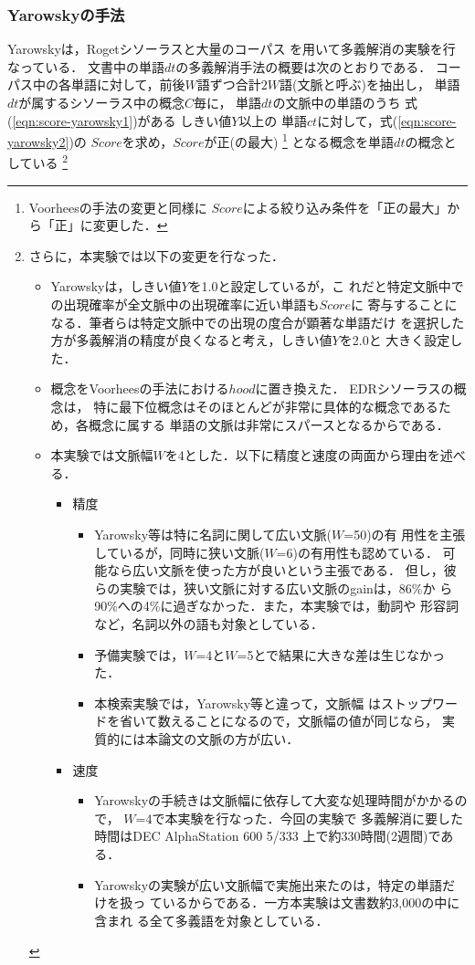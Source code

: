 \subsubsection{Yarowskyの手法}\label{sec:yarowsky-apply}
\vspace*{-1mm}
  Yarowskyは，Rogetシソーラスと大量のコーパス
  を用いて多義解消の実験を行なっている\cite{Yarowsky92}． 
  文書中の単語$dt$の多義解消手法の概要は次のとおりである．
  コーパス中の各単語に対して，前後$W$語ずつ合計$2W$語(文脈と呼ぶ)を抽出し，
  単語$dt$が属するシソーラス中の概念$C$毎に，
  単語$dt$の文脈中の単語のうち
     式(\ref{eqn:score-yarowsky1})がある
     しきい値$Y$以上の
  単語$ct$に対して，式(\ref{eqn:score-yarowsky2})の
  $Score$を求め，$Score$が正(の最大)
  \footnote{
Voorheesの手法の変更と同様に
$Score$による{\dg 絞り込み条件を「正の最大」から「正」に変更}した．}
となる概念を単語$dt$の概念としている
\footnote{
さらに，本実験では以下の変更を行なった．
\begin{itemize}
\topsep=0mm
\partopsep=0mm
\parskip=0mm
\parsep=0mm
\itemsep=0mm
\item 
  Yarowskyは，しきい値$Y$を1.0と設定しているが，こ
  れだと特定文脈中での出現確率が全文脈中の出現確率に近い単語も$Score$に
  寄与することになる．筆者らは特定文脈中での出現の度合が顕著な単語だけ
  を選択した方が多義解消の精度が良くなると考え，しきい値$Y$を2.0と
  大きく設定した．
\item   
  概念をVoorheesの手法における$hood$に置き換えた．
  EDRシソーラスの概念は，
     特に最下位概念はそのほとんどが非常に具体的な概念であるため，各概念に属する
     単語の文脈は非常にスパースとなるからである．
\item
本実験では文脈幅$W$を4とした．以下に精度と速度の両面から理由を述べる．
\begin{itemize}
\item 精度
\begin{itemize}
\item 
Yarowsky等\cite{Yarowsky92,Gale93}は特に名詞に関して広い文脈($W$=50)の有
用性を主張しているが，同時に狭い文脈($W$=6)の有用性も認めている．
可能なら広い文脈を使った方が良いという主張である．
但し，彼らの実験では，狭い文脈に対する広い文脈のgainは，86\%か
ら90\%への4\%に過ぎなかった．また，本実験では，動詞や
形容詞など，名詞以外の語も対象としている．
\item 
予備実験では，$W$=4と$W$=5とで結果に大きな差は生じなかった．
\item 
本検索実験では，Yarowsky等\cite{Yarowsky92,Gale93}と違って，文脈幅
はストップワードを省いて数えることになるので，文脈幅の値が同じなら，
実質的には本論文の文脈の方が広い．
\end{itemize}
\item 速度
\begin{itemize}
\item 
Yarowskyの手続きは文脈幅に依存して大変な処理時間がかかるので，
$W$=4で本実験を行なった．今回の実験で
多義解消に要した時間はDEC AlphaStation 600 5/333
上で約330時間(2週間)である．
\item Yarowskyの実験が広い文脈幅で実施出来たのは，特定の単語だけを扱っ
ているからである．一方本実験は文書数約3,000の中に含まれ
る全て多義語を対象としている．
\end{itemize}
\end{itemize}
\end{itemize}
}
